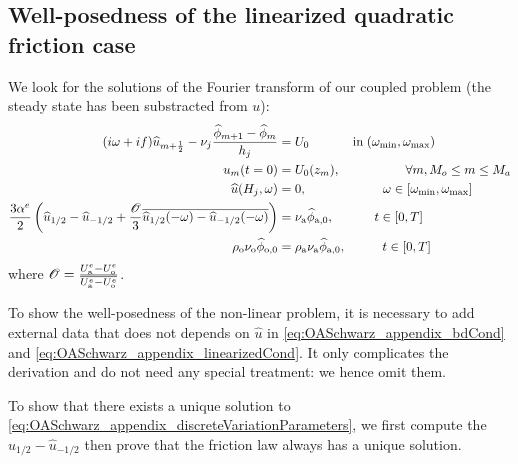 \begin{subappendices}
\section{Well-posedness of the linearized quadratic friction case}
\label{sec:OASchwarz_appendix_discreteVariationParameters}
We look for the solutions of the Fourier transform of our
coupled problem (the steady state has been substracted from $u$):
\begin{subequations}
	\label{eq:OASchwarz_appendix_discreteVariationParameters}
	\begin{align}
	(i\omega + if) \widehat{u}_{m+\frac{1}{2}} -
		\nu_j \frac{\widehat{\phi}_{m+1} -
		\widehat{\phi}_m}{h_j}
		&=U_0
	\hspace{1.2cm} \mbox{in}\;
	(\omega_{\min},\omega_{\max})
		\label{eq:OASchwarz_appendix_eqFourier}\\
		u_m(t=0) &= U_0(z_m),   \hspace{1.8cm}
		\forall m, M_o \leq m \leq M_a \\
		\widehat{u}(H_j, \omega) &= 0,
		\hspace{2.1cm}
		\omega \in [\omega_{\min},\omega_{\max}]
		\label{eq:OASchwarz_appendix_bdCond}\\
		\frac{3\alpha^e}{2} 
		\left( \widehat{u}_{1/2} - \widehat{u}_{-1/2}
		+ \frac{{\cal O}}{3} \overline{
		\widehat{u}_{1/2}(-\omega) -
		\widehat{u}_{-1/2}(-\omega)} \right) &=
		\nu_{\rm a}\widehat{\phi}_{\rm a, 0},
		\hspace{1.12cm} t \in [0,T]
		\label{eq:OASchwarz_appendix_linearizedCond}
		\\
		\rho_{\rm o} \nu_{\rm o}\widehat{\phi}_{\rm o, 0}
		&= \rho_{\rm a} \nu_{\rm a}\widehat{\phi}_{\rm a, 0},
		\hspace{1.0cm} t \in [0,T]
		\label{eq:OASchwarz_appendix_continuityFlux}
		\end{align}
		\end{subequations}
where ${\cal O} = \frac{U_{\rm a}^e - U_{\rm o}^e}{\overline{U_{\rm a}^e
	- U_{\rm o}^e}}$.
\begin{remark}
	To show the well-posedness of the non-linear
	problem, it is necessary to add external data
	that does not depends on $\widehat{u}$
	in \eqref{eq:OASchwarz_appendix_bdCond} and
	\eqref{eq:OASchwarz_appendix_linearizedCond}.
	It only complicates the derivation and do not need
	any special treatment: we hence omit them.
\end{remark}
To show that there exists a unique solution to
\eqref{eq:OASchwarz_appendix_discreteVariationParameters},
we first compute the $\widehat{u}_{1/2} - \widehat{u}_{-1/2}$
then prove that the friction law always has a unique solution.

\end{subappendices}
